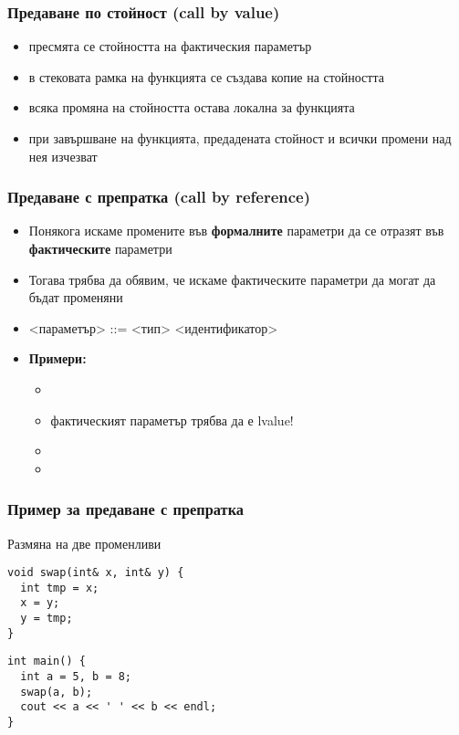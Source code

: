 \documentclass[alsotrans]{beamerswitch}
\begin{document}
\begin{frame}
  \frametitle{Предаване по стойност (call by value)}

  \begin{itemize}[<+->]
  \item пресмята се стойността на фактическия параметър
  \item в стековата рамка на функцията се създава \alert{копие} на стойността
  \item всяка промяна на стойността остава локална за функцията
  \item при завършване на функцията, предадената стойност и всички промени над нея \alert{изчезват}
  \end{itemize}
\end{frame}

\begin{frame}
  \frametitle{Предаване с препратка (call by reference)}

  \begin{itemize}[<+->]
  \item Понякога искаме промените във \textbf{формалните} параметри
    да се отразят във \textbf{фактическите} параметри
  \item Тогава трябва да обявим, че искаме фактическите параметри да могат да бъдат променяни
  \item{} <параметър> ::= <тип>\tta{\&} <идентификатор>
  \item \textbf{Примери:}
    \begin{itemize}
    \item {}
    \item \alert{фактическият параметър трябва да е lvalue!}
    \item {}
    \item {}
    \end{itemize}
  \end{itemize}
\end{frame}

\begin{frame}[fragile]
  \frametitle{Пример за предаване с препратка}

  Размяна на две променливи
\begin{lstlisting}
void swap(int& x, int& y) {
  int tmp = x;
  x = y;
  y = tmp;
}
\end{lstlisting}
\pause
\begin{lstlisting}
int main() {
  int a = 5, b = 8;
  swap(a, b);
  cout << a << ' ' << b << endl;
}
\end{lstlisting}
\end{frame}
\end{document}
